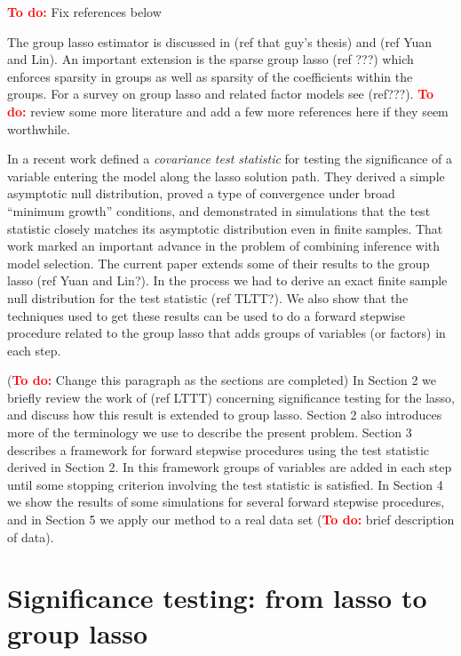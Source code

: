 \documentclass{imsart}
\newcommand{\todo}{\textcolor{red}{\textbf{To do: }}}
\begin{document}

\todo Fix references below

The group lasso estimator is discussed in (ref that guy's thesis) and
(ref Yuan and Lin).  An important extension is the sparse group lasso
(ref ???) which enforces sparsity in groups as well as sparsity of the
coefficients within the groups.  For a survey on group lasso and
related factor models see (ref???). \todo review some more literature
and add a few more references here if they seem worthwhile. 


In a recent work \cite{significance:lasso} defined a \emph{covariance
  test statistic} for testing the significance of a variable entering
the model along the lasso solution path.  They derived a simple
asymptotic null distribution, proved a type of convergence under broad
``minimum growth'' conditions, and demonstrated in simulations that
the test statistic closely matches its asymptotic distribution even in
finite samples.  That work marked an important advance in the problem
of combining inference with model selection.  The current paper
extends some of their results to the group lasso (ref Yuan and Lin?).
In the process we had to derive an exact finite sample null
distribution for the test statistic (ref TLTT?).  We also show that
the techniques used to get these results can be used to do a forward
stepwise procedure related to the group lasso that adds groups of
variables (or factors) in each step. 


(\todo Change this paragraph as the sections are completed)
In Section 2 we briefly review the work of (ref LTTT) concerning
significance testing for the lasso, and discuss how this result is
extended to group lasso. Section 2 also introduces more of the
terminology we use to describe the present problem. Section 3
describes a framework for forward stepwise procedures using the test
statistic derived in Section 2. In this framework groups of variables
are added in each step until some stopping criterion involving the
test statistic is satisfied. In Section 4 we show the results of some
simulations for several forward stepwise procedures, and in Section 5
we apply our method to a real data set (\todo brief description of
data). 


\section{Significance testing: from lasso to group lasso}
\label{sec:testing}
\end{document}
